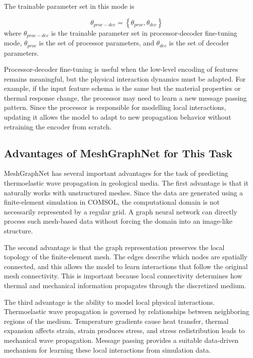 The trainable parameter set in this mode is

\begin{equation}
\theta_{proc-dec}
=
\left\{
\theta_{proc},
\theta_{dec}
\right\}
\end{equation}
where \(\theta_{proc-dec}\) is the trainable parameter set in processor-decoder fine-tuning mode, \(\theta_{proc}\) is the set of processor parameters, and \(\theta_{dec}\) is the set of decoder parameters.

Processor-decoder fine-tuning is useful when the low-level encoding of features remains meaningful, but the physical interaction dynamics must be adapted. For example, if the input feature schema is the same but the material properties or thermal response change, the processor may need to learn a new message passing pattern. Since the processor is responsible for modelling local interactions, updating it allows the model to adapt to new propagation behavior without retraining the encoder from scratch.

\subsection{Advantages of MeshGraphNet for This Task}

MeshGraphNet has several important advantages for the task of predicting thermoelastic wave propagation in geological media. The first advantage is that it naturally works with unstructured meshes. Since the data are generated using a finite-element simulation in COMSOL, the computational domain is not necessarily represented by a regular grid. A graph neural network can directly process such mesh-based data without forcing the domain into an image-like structure.

The second advantage is that the graph representation preserves the local topology of the finite-element mesh. The edges describe which nodes are spatially connected, and this allows the model to learn interactions that follow the original mesh connectivity. This is important because local connectivity determines how thermal and mechanical information propagates through the discretized medium.

The third advantage is the ability to model local physical interactions. Thermoelastic wave propagation is governed by relationships between neighboring regions of the medium. Temperature gradients cause heat transfer, thermal expansion affects strain, strain produces stress, and stress redistribution leads to mechanical wave propagation. Message passing provides a suitable data-driven mechanism for learning these local interactions from simulation data.

